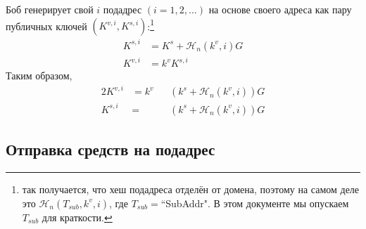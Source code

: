 Боб генерирует свой $i$ подадрес $(i = 1, 2, ...)$ на основе своего адреса как пару публичных ключей $(K^{v,i}, K^{s,i})$:\footnote{так получается, что хеш подадреса отделён от домена, поэтому на самом деле это $\mathcal{H}_n(T_{sub},k^v,i)$, где $T_{sub} = $``SubAddr". В этом документе мы опускаем $T_{sub}$ для краткости.}\vspace{.175cm}
\begin{align*}
    K^{s,i} &= K^s + \mathcal{H}_n(k^v, i) G\\
    K^{v,i} &= k^v K^{s,i}
\end{align*}
\quad Таким образом,
\begin{alignat*}{2}
    K^{v,i} &= k^v&&(k^s + \mathcal{H}_n(k^v, i))G\\
    K^{s,i} &= &&(k^s + \mathcal{H}_n(k^v, i))G
\end{alignat*}
    

\subsection{Отправка средств на подадрес}
    
